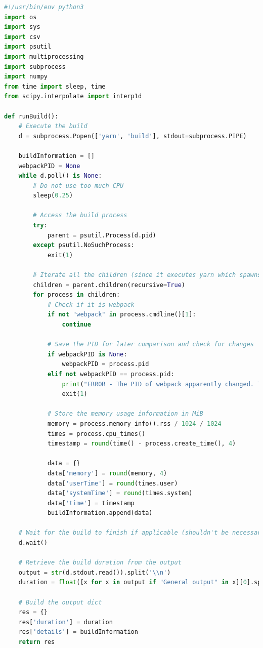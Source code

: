 \documentclass[11pt]{report}
\begin{document}
		\begin{lstlisting}[language=Python,caption={Automatisierte Build-Messung (runBuild.py)},label={pythonScript}]
#!/usr/bin/env python3
import os
import sys
import csv
import psutil
import multiprocessing
import subprocess
import numpy
from time import sleep, time
from scipy.interpolate import interp1d

def runBuild():
    # Execute the build
    d = subprocess.Popen(['yarn', 'build'], stdout=subprocess.PIPE)

    buildInformation = []
    webpackPID = None
    while d.poll() is None:
        # Do not use too much CPU
        sleep(0.25)

        # Access the build process
        try:
            parent = psutil.Process(d.pid)
        except psutil.NoSuchProcess:
            exit(1)

        # Iterate all the children (since it executes yarn which spawns webpack as a child)
        children = parent.children(recursive=True)
        for process in children:
            # Check if it is webpack
            if not "webpack" in process.cmdline()[1]:
                continue

            # Save the PID for later comparison and check for changes
            if webpackPID is None:
                webpackPID = process.pid
            elif not webpackPID == process.pid:
                print("ERROR - The PID of webpack apparently changed. This is not supposed to happen")
                exit(1)

            # Store the memory usage information in MiB
            memory = process.memory_info().rss / 1024 / 1024
            times = process.cpu_times()
            timestamp = round(time() - process.create_time(), 4)

            data = {}
            data['memory'] = round(memory, 4)
            data['userTime'] = round(times.user)
            data['systemTime'] = round(times.system)
            data['time'] = timestamp
            buildInformation.append(data)

    # Wait for the build to finish if applicable (shouldn't be necessary due to the while condition but better safe than sorry)
    d.wait()

    # Retrieve the build duration from the output
    output = str(d.stdout.read()).split('\\n')
    duration = float([x for x in output if "General output" in x][0].split(' ')[4])
    
    # Build the output dict
    res = {}
    res['duration'] = duration
    res['details'] = buildInformation
    return res



\end{lstlisting}
\end{document}
